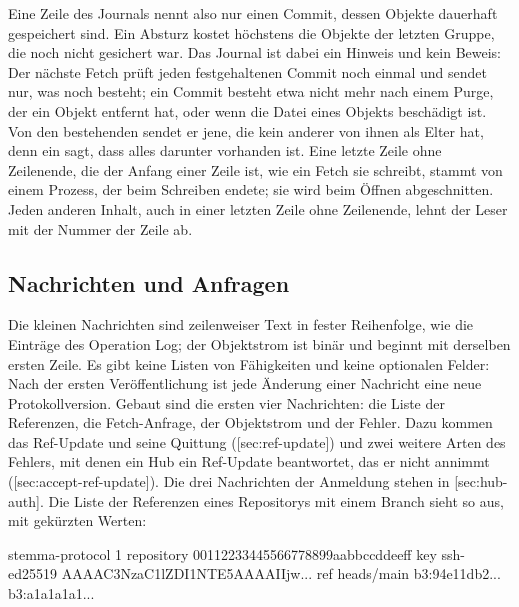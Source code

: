 Eine Zeile des Journals nennt also nur einen Commit, dessen Objekte dauerhaft gespeichert sind.
Ein Absturz kostet höchstens die Objekte der letzten Gruppe, die noch nicht gesichert war.
Das Journal ist dabei ein Hinweis und kein Beweis: Der nächste Fetch prüft jeden festgehaltenen
Commit noch einmal und sendet nur, was noch besteht; ein Commit besteht etwa nicht mehr nach
einem Purge, der ein Objekt entfernt hat, oder wenn die Datei eines Objekts beschädigt ist.
Von den bestehenden sendet er jene, die kein anderer von ihnen als Elter hat, denn ein
 sagt, dass alles darunter vorhanden ist.
Eine letzte Zeile ohne Zeilenende, die der Anfang einer Zeile ist, wie ein Fetch sie schreibt,
stammt von einem Prozess, der beim Schreiben endete; sie wird beim Öffnen abgeschnitten.
Jeden anderen Inhalt, auch in einer letzten Zeile ohne Zeilenende, lehnt der Leser mit der
Nummer der Zeile ab.

\subsection{Nachrichten und Anfragen}

Die kleinen Nachrichten sind zeilenweiser Text in fester Reihenfolge, wie die Einträge des
Operation Log; der Objektstrom ist binär und beginnt mit derselben ersten Zeile.
Es gibt keine Listen von Fähigkeiten und keine optionalen Felder: Nach der ersten Veröffentlichung
ist jede Änderung einer Nachricht eine neue Protokollversion.
Gebaut sind die ersten vier Nachrichten: die Liste der Referenzen, die Fetch-Anfrage, der
Objektstrom und der Fehler.
Dazu kommen das Ref-Update und seine Quittung ([sec:ref-update])
und zwei weitere Arten des Fehlers, mit denen ein Hub ein Ref-Update beantwortet, das er nicht
annimmt ([sec:accept-ref-update]).
Die drei Nachrichten der Anmeldung stehen in [sec:hub-auth].
Die Liste der Referenzen eines Repositorys mit einem Branch sieht so aus, mit gekürzten Werten:

\starttyping
stemma-protocol 1
repository 00112233445566778899aabbccddeeff
key ssh-ed25519 AAAAC3NzaC1lZDI1NTE5AAAAIIjw...
ref heads/main b3:94e11db2... b3:a1a1a1a1...
\stoptyping

